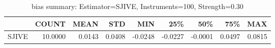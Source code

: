 \begin{table}[ht]
\centering
\caption{bias summary: Estimator=SJIVE, Instruments=100, Strength=0.30}
\begin{tabular}{lrrrrrrrr}
\toprule
 & COUNT & MEAN & STD & MIN & 25\% & 50\% & 75\% & MAX \\
\midrule
SJIVE & 10.0000 & 0.0143 & 0.0408 & -0.0248 & -0.0227 & -0.0001 & 0.0497 & 0.0815 \\
\bottomrule
\end{tabular}
\end{table}
